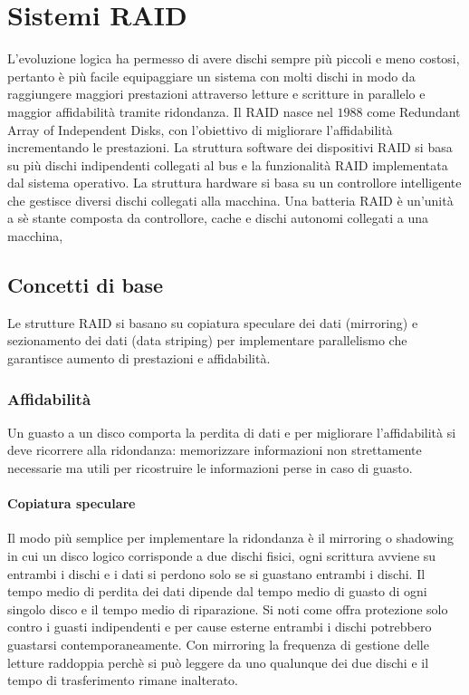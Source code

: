 \chapter{Sistemi RAID}
L'evoluzione logica ha permesso di avere dischi sempre pi\`u piccoli e meno costosi, pertanto \`e pi\`u facile equipaggiare un sistema con molti dischi in modo da raggiungere maggiori
prestazioni attraverso letture e scritture in parallelo e maggior affidabilit\`a tramite ridondanza. Il RAID nasce nel $1988$ come Redundant Array of Independent Disks, con l'obiettivo
di migliorare l'affidabilit\`a incrementando le prestazioni. La struttura software dei dispositivi RAID si basa su pi\`u dischi indipendenti collegati al bus e la funzionalit\`a RAID
implementata dal sistema operativo. La struttura hardware si basa su un controllore intelligente che gestisce diversi dischi collegati alla macchina. Una batteria RAID \`e un'unit\`a
a s\`e stante composta da controllore, cache e dischi autonomi collegati a una macchina, 
\section{Concetti di base}
Le strutture RAID si basano su copiatura speculare dei dati (mirroring) e sezionamento dei dati (data striping) per implementare parallelismo che garantisce aumento di prestazioni e 
affidabilit\`a. 
\subsection{Affidabilit\`a}
Un guasto a un disco comporta la perdita di dati e per migliorare l'affidabilit\`a si deve ricorrere alla ridondanza: memorizzare informazioni non strettamente necessarie ma utili per
ricostruire le informazioni perse in caso di guasto. 
\subsubsection{Copiatura speculare}
Il modo pi\`u semplice per implementare la ridondanza \`e il mirroring o shadowing in cui un disco logico corrisponde a due dischi fisici, ogni scrittura avviene su entrambi i dischi
e i dati si perdono solo se si guastano entrambi i dischi. Il tempo medio di perdita dei dati dipende dal tempo medio di guasto di ogni singolo disco e il tempo medio di riparazione. Si
noti come offra protezione solo contro i guasti indipendenti e per cause esterne entrambi i dischi potrebbero guastarsi contemporaneamente. Con mirroring la frequenza di gestione delle
letture raddoppia perch\`e si pu\`o leggere da uno qualunque dei due dischi e il tempo di trasferimento rimane inalterato. 
